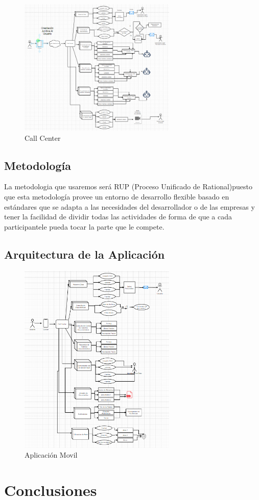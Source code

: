 \documentclass[twoside,twocolumn]{article}
\begin{document}
\begin{figure}[h!]
	\begin{center}
		\includegraphics[width=7.5cm]{./Imagenes/callcenter} 
		\caption{Call Center}
	\end{center}
\end{figure}


\subsection{Metodología}
La metodologia que usaremos será RUP (Proceso Unificado de Rational)puesto que esta metodología provee un entorno de desarrollo flexible basado en estándares que se adapta a las necesidades del desarrollador o de las empresas y tener la facilidad de dividir todas las actividades de forma de que a cada participantele pueda tocar la parte que le compete.

\subsection{Arquitectura de la Aplicación}

\begin{figure}[h!]
	\begin{center}
		\includegraphics[width=7.5cm]{./Imagenes/apk} 
		\caption{Aplicación Movil}
	\end{center}
\end{figure}

\section{Conclusiones}
\end{document}
